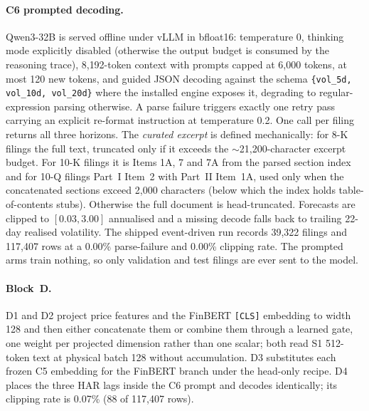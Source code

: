\paragraph{C6 prompted decoding.} Qwen3-32B is served offline under vLLM in
bfloat16: temperature 0, thinking mode explicitly disabled (otherwise the output
budget is consumed by the reasoning trace), 8{,}192-token context with prompts
capped at 6{,}000 tokens, at most 120 new tokens, and guided JSON decoding against
the schema \verb|{vol_5d, vol_10d, vol_20d}| where the installed engine exposes
it, degrading to regular-expression parsing otherwise. %
A parse failure triggers exactly one retry pass carrying an explicit re-format
instruction at temperature 0.2. One call per filing returns all three horizons.
The \emph{curated excerpt} is defined mechanically: for 8-K filings the full text,
truncated only if it exceeds the $\sim$21{,}200-character excerpt budget. For
10-K filings it is Items 1A, 7 and 7A from the parsed section index and for 10-Q
filings Part~I Item~2 with Part~II Item~1A, used only when the concatenated
sections exceed 2{,}000 characters (below which the index holds
table-of-contents stubs). Otherwise the full document is head-truncated. %
Forecasts are clipped to $[0.03, 3.00]$ annualised and a missing decode falls back
to trailing 22-day realised volatility. The shipped event-driven run records
39{,}322 filings and 117{,}407 rows at a 0.00\% parse-failure and 0.00\% clipping
rate. %
The prompted arms train nothing, so only validation and test filings are ever
sent to the model.

\paragraph{Block~D.} D1 and D2 project price features and the FinBERT
\texttt{[CLS]} embedding to width 128 and then either concatenate them or combine
them through a learned gate, one weight per projected dimension rather than one
scalar; both read S1 512-token text at physical batch
128 without accumulation. %
D3 substitutes each frozen C5 embedding for the FinBERT branch under the
head-only recipe. D4 places the three HAR lags inside the C6 prompt and decodes
identically; its clipping rate is 0.07\% (88 of 117{,}407 rows). %



